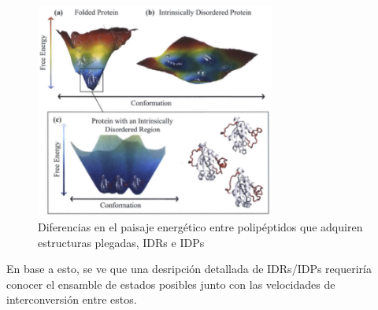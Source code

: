 \begin{figure}[h]
\centering
\includegraphics[width=0.7\textwidth]{img/idp-folded-EnLandscape.png} 
\caption{Diferencias en el paisaje energético entre polipéptidos que adquiren estructuras plegadas, IDRs e IDPs }
\label{idp-folded-EnergyLandscape}
\end{figure}


En base a esto, se ve que una desripción detallada de IDRs/IDPs requeriría conocer el ensamble de estados posibles junto con las velocidades de interconversión entre estos.

